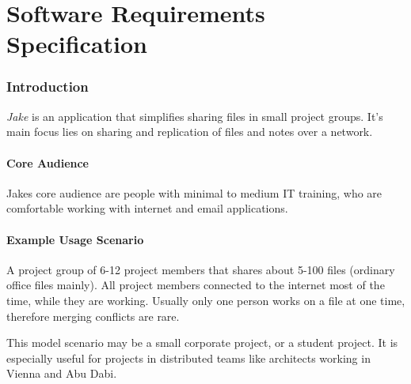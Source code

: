 

\part{Software Requirements Specification}

\section{Introduction}
\emph{Jake} is an application that simplifies sharing files in small project groups. It's main focus lies on sharing and replication of files and notes over a network.

\subsection{Core Audience}
Jakes core audience are people with minimal to medium IT training, who are comfortable working with internet and email applications.

\subsection{Example Usage Scenario}
A project group of 6-12 project members that shares about 5-100 files (ordinary office files mainly). All project members connected to the internet most of the time, while they are working. Usually only one person works on a file at one time, therefore merging conflicts are rare.

This model scenario may be a small corporate project, or a student project. It is especially useful for projects in distributed teams like architects working in Vienna and Abu Dabi.

